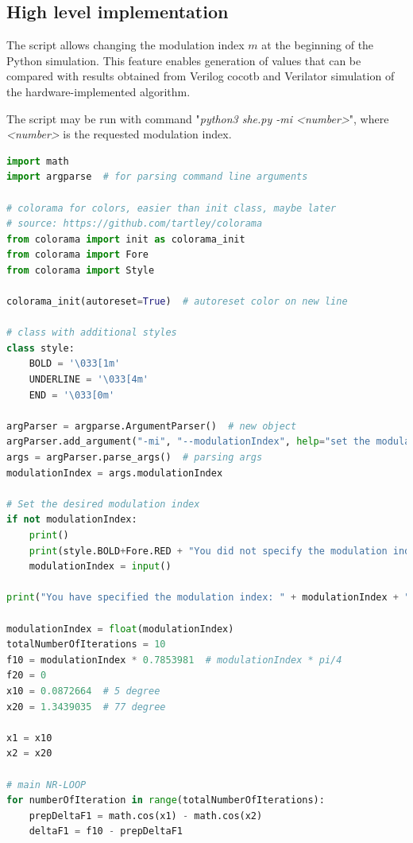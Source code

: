 \documentclass[a4paper, twoside, 11pt]{article}
\begin{document}
    \subsection{High level implementation}
    The script allows changing the modulation index $m$ at the beginning of the Python simulation. This feature enables generation of values that can be compared with results obtained from Verilog cocotb and Verilator simulation of the hardware-implemented algorithm.\par
    The script may be run with command "\textit{python3 she.py -mi <number>}", where \textit{<number>} is the requested modulation index.
\begin{lstlisting}[language={python}, caption={Python implementation of the Selective Harmonic Elimination Algorithm with adjustable modulation index.}, label= {lst:she-python}]
import math
import argparse  # for parsing command line arguments

# colorama for colors, easier than init class, maybe later
# source: https://github.com/tartley/colorama
from colorama import init as colorama_init
from colorama import Fore
from colorama import Style

colorama_init(autoreset=True)  # autoreset color on new line

# class with additional styles
class style:
    BOLD = '\033[1m'
    UNDERLINE = '\033[4m'
    END = '\033[0m'

argParser = argparse.ArgumentParser()  # new object
argParser.add_argument("-mi", "--modulationIndex", help="set the modulation index 0-1") # adding argument
args = argParser.parse_args()  # parsing args
modulationIndex = args.modulationIndex

# Set the desired modulation index
if not modulationIndex:
    print()
    print(style.BOLD+Fore.RED + "You did not specify the modulation index with mi command, specify it now:\n" + style.END)
    modulationIndex = input()

print("You have specified the modulation index: " + modulationIndex + ".\n")

modulationIndex = float(modulationIndex)
totalNumberOfIterations = 10
f10 = modulationIndex * 0.7853981  # modulationIndex * pi/4
f20 = 0
x10 = 0.0872664  # 5 degree
x20 = 1.3439035  # 77 degree

x1 = x10
x2 = x20

# main NR-LOOP
for numberOfIteration in range(totalNumberOfIterations):
    prepDeltaF1 = math.cos(x1) - math.cos(x2)
    deltaF1 = f10 - prepDeltaF1


\end{lstlisting}
\end{document}
